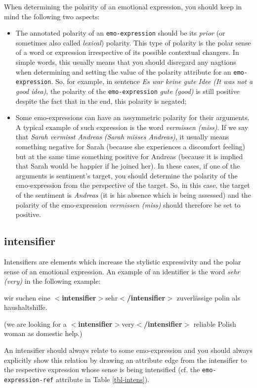 \documentclass[11pt,a4paper]{article}
\newcommand{\xmltag}[1]{{\textbf{\small$<$#1$>$}}}
\newcommand{\intensifier}[1]{\xmltag{intensifier}#1\xmltag{/intensifier}}
\newenvironment{myexe}{
  \begin{exe}
    \ex\begin{center}
    \itshape
}{
    \end{center}
  \end{exe}
}
\begin{document}
When determining the polarity of an emotional expression, you should keep in
mind the following two aspects:
\begin{itemize}
  \item The annotated polarity of an \texttt{emo-expression} should be its
    \textit{prior} (or sometimes also called \textit{lexical}) polarity.  This
    type of polarity is the polar sense of a word or expression irrespective
    of its possible contextual changers.  In simple words, this usually means
    that you should disregard any nagtions when determining and setting the
    value of the polarity attribute for an \texttt{emo-expression}. So, for
    example, in sentence \textit{Es war keine gute Idee (It was not a good
      idea)}, the polarity of the \texttt{emo-expression} \textit{gute (good)}
    is still positive despite the fact that in the end, this polarity is
    negated;

  \item Some emo-expressions can have an assymmetric polarity for their
    arguments.  A typical example of such expression is the word
    \textit{vermissen (miss)}.  If we say that \textit{Sarah vermisst Andreas
      (Sarah misses Andreas)}, it usually means something negative for Sarah
    (because she experiences a discomfort feeling) but at the same time
    something positive for Andreas (because it is implied that Sarah would be
    happier if he joined her).  In these cases, if one of the arguments is
    sentiment's target, you should determine the polarity of the
    emo-expression from the perspective of the target.  So, in this case, the
    target of the sentiment is \textit{Andreas} (it is his absence which is
    being assessed) and the polarity of the emo-expression \textit{vermissen
      (miss)} should therefore be set to positive.
\end{itemize}

\subsection{intensifier}
Intensifiers are elements which increase the stylistic expressivity and the
polar sense of an emotional expression.  An example of an identifier is the
word \textit{sehr (very)} in the following example:
\begin{myexe}
  wir suchen eine \intensifier{sehr} zuverl\"assige polin als
  haushaltshilfe.

  (we are looking for a \intensifier{very} reliable Polish woman as
  domestic help.)
\end{myexe}
An intensifier should always relate to some emo-expression and you should
always explicitly show this relation by drawing an attribute edge from the
intensifier to the respective expression whose sense is being intensified
(cf. the \texttt{emo-expression-ref} attribute in Table \ref{tbl-intens}).
\end{document}
